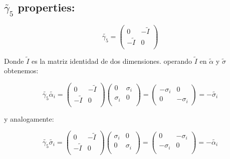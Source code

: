 \documentclass[a4paper, 12pt]{article} %
\begin{document}
\subsection*{$\widetilde{\gamma_5}$ properties:}

\[
\widetilde{\gamma_5} = 
\begin{pmatrix} 
0 & - \widetilde{I} \\
-\widetilde{I} & 0 \\
\end{pmatrix}
\]

Donde $\widetilde{I}$ es la matriz identidad de dos dimensiones. operando  $\widetilde{I}$ 
en $\widetilde{\alpha}$ y $\widetilde{\sigma}$ obtenemos:

\[
\widetilde{\gamma_5}\widetilde{\alpha_i} = 
\begin{pmatrix} 
0 & - \widetilde{I} \\
-\widetilde{I} & 0 \\
\end{pmatrix} 
\begin{pmatrix} 
0 & \sigma_i \\
\sigma_i & 0 \\
\end{pmatrix} 
= 
\begin{pmatrix}
-\sigma_i & 0 \\
0 & -\sigma_i
\end{pmatrix}
= -\widetilde{\sigma_i}
\]

y analogamente:

\[
\widetilde{\gamma_5}\widetilde{\sigma_i} = 
\begin{pmatrix} 
0 & - \widetilde{I} \\
-\widetilde{I} & 0 \\
\end{pmatrix} 
\begin{pmatrix} 
\sigma_i & 0 \\
0 & \sigma_i  \\
\end{pmatrix} 
= 
\begin{pmatrix}
0 & -\sigma_i \\
-\sigma_i & 0 \\
\end{pmatrix}
= -\widetilde{\alpha_i}
\]






\end{document}
